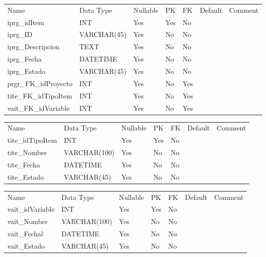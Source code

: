 			\begin{center}
				\begin{tabular}{ |l|l|l|l|l|l|l| }
					\hline
					Name & Data Type & Nullable & PK & FK & Default & Comment \\
					iprg_idItem & INT & Yes & Yes & No &  & \\ \hline 
iprg_ID & VARCHAR(45) & Yes & No & No &  & \\ \hline 
iprg_Descripcion & TEXT & Yes & No & No &  & \\ \hline 
iprg_Fecha & DATETIME & Yes & No & No &  & \\ \hline 
iprg_Estado & VARCHAR(45) & Yes & No & No &  & \\ \hline 
prgr_FK_idProyecto & INT & Yes & No & Yes &  & \\ \hline 
tite_FK_idTipoItem & INT & Yes & No & Yes &  & \\ \hline 
vait_FK_idVariable & INT & Yes & No & Yes &  & \\ \hline 

				\end{tabular}
			\end{center}
		

			\begin{center}
				\begin{tabular}{ |l|l|l|l|l|l|l| }
					\hline
					Name & Data Type & Nullable & PK & FK & Default & Comment \\
					tite_idTipoItem & INT & Yes & Yes & No &  & \\ \hline 
tite_Nombre & VARCHAR(100) & Yes & No & No &  & \\ \hline 
tite_Fecha & DATETIME & Yes & No & No &  & \\ \hline 
tite_Estado & VARCHAR(45) & Yes & No & No &  & \\ \hline 

				\end{tabular}
			\end{center}
		

			\begin{center}
				\begin{tabular}{ |l|l|l|l|l|l|l| }
					\hline
					Name & Data Type & Nullable & PK & FK & Default & Comment \\
					vait_idVariable & INT & Yes & Yes & No &  & \\ \hline 
vait_Nombre & VARCHAR(100) & Yes & No & No &  & \\ \hline 
vait_Fechal & DATETIME & Yes & No & No &  & \\ \hline 
vait_Estado & VARCHAR(45) & Yes & No & No &  & \\ \hline 

				\end{tabular}
			\end{center}
		

